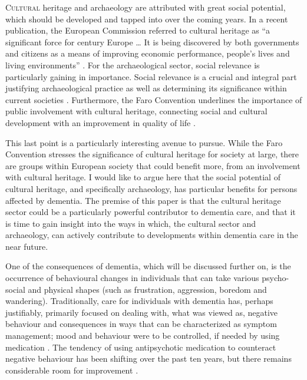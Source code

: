 
\lettrine[nindent=0em,lines=3]{C}{ultural} heritage and archaeology are attributed with great social potential, which should be developed and tapped into over the coming years.
In a recent publication, the European Commission referred to cultural heritage as “a significant force for  century Europe \ldots 
It is being discovered by both governments and citizens as a means of improving economic performance,
people’s lives and living environments” \parencite[5]{Commission_2015}. 
For the archaeological sector, social relevance is particularly gaining in importance. 
Social relevance is a crucial and integral part  justifying archaeological practice as well 
as determining its significance within current societies \parencite{Boom_inpress}.  
Furthermore, the Faro Convention \parencite{Europe_2005}  underlines the importance
of public involvement with cultural heritage, connecting social and cultural development 
with  an improvement in quality of life \parencite[5--7]{Europe_2005}.	
		
This last point is a particularly interesting avenue to pursue. 
While the Faro Convention stresses the significance of cultural heritage 
for society at large, there are groups within European society that could benefit more, 
from an involvement with cultural heritage. I would like to argue here that the social
potential of cultural heritage, and specifically archaeology, has particular benefits for 
persons affected by dementia. The premise of this paper is that the cultural heritage sector
could be a particularly powerful contributor to dementia care, 
and that it is time to gain insight into the ways in which, the cultural sector and
archaeology, can actively contribute to developments within dementia care in the near future. 
	
One of the consequences of dementia, which will be discussed further on, 
is the occurrence of behavioural changes in individuals that can take various psycho-social
and physical shapes (such as frustration, aggression, boredom and wandering).
Traditionally, care for individuals with dementia has, perhaps justifiably,
primarily focused on dealing with, what was viewed as, negative behaviour and consequences 
in ways that can be characterized as symptom management; mood and behaviour were to be
controlled, if needed by using medication \parencites[541]{Kitwood_1993}[541]{Kitwood_1993}.
The tendency of using antipsychotic medication to counteract negative behaviour has been
shifting over the past ten years, but there remains considerable room for improvement
 \parencite[39--44]{Banerjee_2009}.	
	
